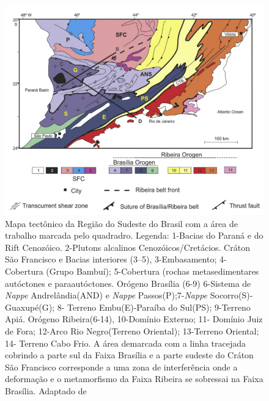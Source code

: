 \begin{figure}[!ht]
\centering
\includegraphics[scale=0.5]{Figs/mapa_geologico.png}
\caption[Mapa tectônico da Região do Sudeste do Brasil segundo  \cite{trouw_new_2013}.]{Mapa tectônico da Região do Sudeste do Brasil com a área de trabalho marcada pelo quadradro. Legenda: 1-Bacias do Paraná e do Rift Cenozóico. 2-Plutons alcalinos Cenozóicos/Cretácios. Cráton São Francisco e Bacias interiores (3–5), 3-Embasamento; 4-Cobertura (Grupo Bambuí); 5-Cobertura (rochas metasedimentares autóctones e paraautóctones. Orógeno Brasília (6-9) 6-Sistema de \textit{Nappe} Andrelândia(AND) e \textit{Nappe} Passos(P);7-\textit{Nappe} Socorro(S)-Guaxupé(G); 8- Terreno Embu(E)-Paraíba do Sul(PS); 9-Terreno Apiá. Orógeno Ribeira(6-14), 10-Domínio Externo; 11- Domínio Juiz de Fora; 12-Arco Rio Negro(Terreno Oriental); 13-Terreno Oriental; 14- Terreno Cabo Frio. A área demarcada com a linha tracejada cobrindo a parte sul da Faixa Brasília e a parte sudeste do Cráton São Francisco corresponde a uma zona de interferência onde a deformação e o metamorfismo da Faixa Ribeira se  sobressai na Faixa Brasília. Adaptado de \cite{trouw_new_2013}}
\label{mapa_geologico}
\end{figure} 


